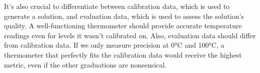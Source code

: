 \begin{bibunit}
It's also crucial to differentiate between calibration data, which is used to generate a solution, and evaluation data, which is used to assess the solution's quality.
A well-functioning thermometer should provide accurate temperature readings even for levels it wasn't calibrated on. Also, evaluation data should differ from calibration data. If we only measure precision at 0°C and 100°C, a thermometer that perfectly fits the calibration data would receive the highest metric, even if the other graduations are nonsensical.





\end{bibunit}
